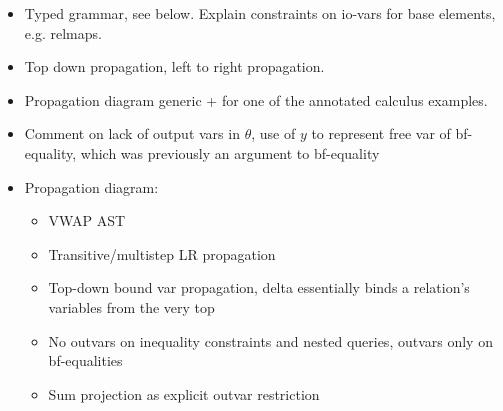 \noindent {}

\begin{itemize}
  \item Typed grammar, see below. Explain constraints on io-vars for
        base elements, e.g. relmaps.
  \item Top down propagation, left to right propagation.
  \item Propagation diagram generic + for one of the annotated calculus
        examples.  
\end{itemize}
 

\begin{itemize}
\item Comment on lack of output vars in $\theta$, use of $y$ to
represent free var of bf-equality, which was previously an argument to
bf-equality

\item Propagation diagram:
    \begin{itemize}
      \item VWAP AST
      \item Transitive/multistep LR propagation
      \item Top-down bound var propagation, delta essentially binds a relation's
      variables from the very top
      \item No outvars on inequality constraints and nested queries, outvars only
      on bf-equalities
      \item Sum projection as explicit outvar restriction
    \end{itemize}

\end{itemize}

